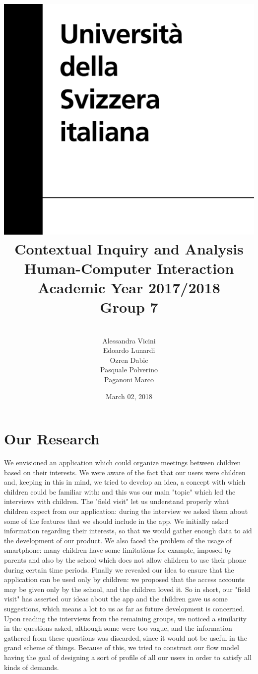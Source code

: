 \documentclass[12pt]{report}
\title {
	\includegraphics[width = .2\linewidth]{University-of-Lugano.png} \break \break
	{\bf\Huge Contextual Inquiry and Analysis}
	\\\large Human-Computer Interaction
	\\\small Academic Year 2017/2018 \break
	\\\large \textbf{Group 7}}
\author{
	\\\large Alessandra Vicini \\ Edoardo Lunardi \\ Ozren Dabic \\ Pasquale Polverino \\ Paganoni Marco}
\date{March 02, 2018}
\begin{document}
	\pagestyle{empty}
	\maketitle
	\section*{\huge Our Research}
	We envisioned an application which could organize meetings
	between children based on their interests. We were aware of the fact 
	that our users were children and, keeping in
	this in mind, we tried to develop an idea, a concept with which
	children could be familiar with: and this was our main "topic" which led the
	interviews with children. The "field visit" let us understand properly
	what children expect from our application: during the interview we asked
	them about some of the features that we should include in the app. 
	We initially asked information regarding their interests, so that
	we would gather enough data to aid the development of our product. 
	We also faced the problem of the usage of smartphone: many children have some limitations for example,
	imposed by parents and also by the school which does not allow children
	to use their phone during certain time periods. Finally we revealed our idea to
	ensure that the application can be used only by children: we
	proposed that the access accounts may be given only by the school, and the
	children loved it. So in short, our "field visit" has
	asserted our ideas about the app and the children gave us some suggestions,
	which means a lot to us as far as future development is concerned.\\

	Upon reading the interviews from the remaining groups, we noticed 
	a similarity in the questions asked, although some were too vague, 
	and the information gathered from these questions was discarded, 
	since it would not be useful in the grand scheme of things. 
	Because of this, we tried to construct our flow model having the goal 
	of designing a sort of profile of all our users in order to satisfy all kinds of demands.\\
\end{document}
